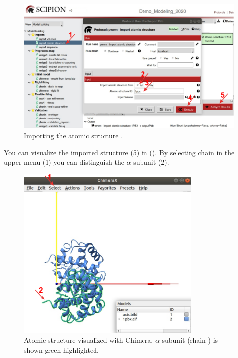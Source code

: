   \begin{figure}[H]
  \centering 
  \captionsetup{width=.9\linewidth} 
  \includegraphics[width=1\textwidth]{Images/Fig10}
  \caption{Importing the atomic structure .}
  \label{fig:import_atomic_structure}
  \end{figure}
  You can visualize the imported structure (5) in \chimera (). By selecting chain  in the \chimera upper menu (1) you can distinguish the  $\alpha$ subunit (2).
  \begin{figure}[H]
  \centering 
  \captionsetup{width=.8\linewidth} 
  \includegraphics[width=0.80\textwidth]{Images/Fig11}
  \caption{Atomic structure  visualized with Chimera.  $\alpha$ subunit (chain ) is shown green-highlighted.}
  \label{fig:chimera_visualization_structure}
  \end{figure}
  
